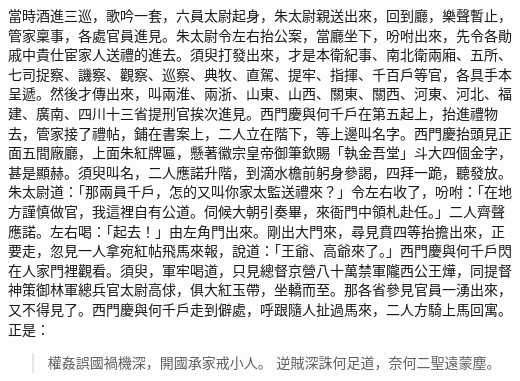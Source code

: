 當時酒進三巡，歌吟一套，六員太尉起身，朱太尉親送出來，回到廳，樂聲暫止，管家稟事，各處官員進見。朱太尉令左右抬公案，當廳坐下，吩咐出來，先令各勛戚中貴仕宦家人送禮的進去。須臾打發出來，才是本衛紀事、南北衛兩廂、五所、七司捉察、譏察、觀察、巡察、典牧、直駕、提牢、指揮、千百戶等官，各具手本呈遞。然後才傳出來，叫兩淮、兩浙、山東、山西、關東、關西、河東、河北、福建、廣南、四川十三省提刑官挨次進見。西門慶與何千戶在第五起上，抬進禮物去，管家接了禮帖，鋪在書案上，二人立在階下，等上邊叫名字。西門慶抬頭見正面五間廠廳，上面朱紅牌匾，懸著徽宗皇帝御筆欽賜「執金吾堂」斗大四個金字，甚是顯赫。須臾叫名，二人應諾升階，到滴水檐前躬身參謁，四拜一跪，聽發放。朱太尉道：「那兩員千戶，怎的又叫你家太監送禮來？」令左右收了，吩咐：「在地方謹慎做官，我這裡自有公道。伺候大朝引奏畢，來衙門中領札赴任。」二人齊聲應諾。左右喝：「起去！」由左角門出來。剛出大門來，尋見賁四等抬擔出來，正要走，忽見一人拿宛紅帖飛馬來報，說道：「王爺、高爺來了。」西門慶與何千戶閃在人家門裡觀看。須臾，軍牢喝道，只見總督京營八十萬禁軍隴西公王燁，同提督神策御林軍總兵官太尉高俅，俱大紅玉帶，坐轎而至。那各省參見官員一湧出來，又不得見了。西門慶與何千戶走到僻處，呼跟隨人扯過馬來，二人方騎上馬回寓。正是：
\begin{quote}
權姦誤國禍機深，開國承家戒小人。
逆賊深誅何足道，奈何二聖遠蒙塵。
\end{quote}
